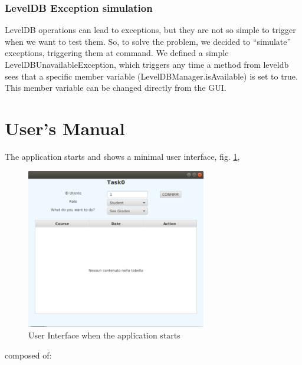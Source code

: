 \documentclass{report}
\begin{document}
\subsection*{LevelDB Exception simulation}
LevelDB operations can lead to exceptions, but they are not so simple to trigger when we want to test them. So, to solve the problem, we decided to ``simulate'' exceptions, triggering them at command. We defined a simple LevelDBUnavailableException, which triggers any time a method from leveldb sees that a specific member variable (LevelDBManager.isAvailable) is set to true. This member variable can be changed directly from the GUI.


\chapter*{User's Manual}
The application starts and shows a minimal user interface, fig. \ref{fig:UIStart},
\begin{figure}[h!]
	\centering
	\includegraphics[width=0.7\textwidth]{UIStart.png}
	\caption{User Interface when the application starts}
	\label{fig:UIStart}
\end{figure}
composed of:
\end{document}
